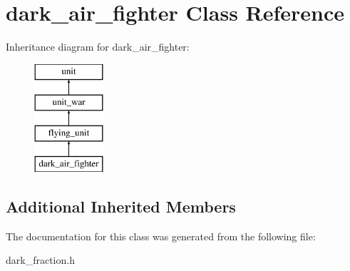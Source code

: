 \hypertarget{classdark__air__fighter}{}\section{dark\+\_\+air\+\_\+fighter Class Reference}
\label{classdark__air__fighter}
Inheritance diagram for dark\+\_\+air\+\_\+fighter\+:\begin{figure}[H]
\begin{center}
\leavevmode
\includegraphics[height=4.000000cm]{classdark__air__fighter}
\end{center}
\end{figure}
\subsection*{Additional Inherited Members}


The documentation for this class was generated from the following file\+:\begin{DoxyCompactItemize}
\item 
dark\+\_\+fraction.\+h\end{DoxyCompactItemize}
